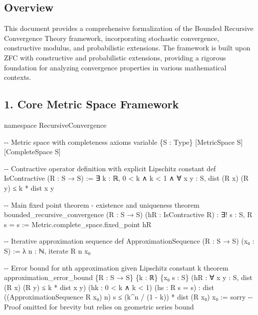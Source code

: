 \documentclass[
]{article}
\newenvironment{Shaded}{}{}
\newcommand{\NormalTok}[1]{#1}
\begin{document}
\subsection{Overview}\label{overview}

This document provides a comprehensive formalization of the Bounded
Recursive Convergence Theory framework, incorporating stochastic
convergence, constructive modulus, and probabilistic extensions. The
framework is built upon ZFC with constructive and probabilistic
extensions, providing a rigorous foundation for analyzing convergence
properties in various mathematical contexts.

\subsection{1. Core Metric Space
Framework}\label{core-metric-space-framework}

\begin{Shaded}
\begin{Highlighting}[]
\NormalTok{namespace RecursiveConvergence}

\NormalTok{{-}{-} Metric space with completeness axioms}
\NormalTok{variable \{S : Type\} [MetricSpace S] [CompleteSpace S]}

\NormalTok{{-}{-} Contractive operator definition with explicit Lipschitz constant}
\NormalTok{def IsContractive (R : S → S) :=}
\NormalTok{  ∃ k : ℝ, 0 \textless{} k ∧ k \textless{} 1 ∧ ∀ x y : S, dist (R x) (R y) ≤ k * dist x y}

\NormalTok{{-}{-} Main fixed point theorem {-} existence and uniqueness}
\NormalTok{theorem bounded\_recursive\_convergence}
\NormalTok{  (R : S → S) (hR : IsContractive R) :}
\NormalTok{  ∃! s : S, R s = s :=}
\NormalTok{  Metric.complete\_space.fixed\_point hR}

\NormalTok{{-}{-} Iterative approximation sequence}
\NormalTok{def ApproximationSequence (R : S → S) (x₀ : S) := λ n : ℕ, iterate R n x₀}

\NormalTok{{-}{-} Error bound for nth approximation given Lipschitz constant k}
\NormalTok{theorem approximation\_error\_bound}
\NormalTok{  \{R : S → S\} \{k : ℝ\} \{x₀ s : S\}}
\NormalTok{  (hR : ∀ x y : S, dist (R x) (R y) ≤ k * dist x y)}
\NormalTok{  (hk : 0 \textless{} k ∧ k \textless{} 1)}
\NormalTok{  (hs : R s = s) :}
\NormalTok{  dist ((ApproximationSequence R x₀) n) s ≤ (k\^{}n / (1 {-} k)) * dist (R x₀) x₀ :=}
\NormalTok{  sorry {-}{-} Proof omitted for brevity but relies on geometric series bound}
\end{Highlighting}
\end{Shaded}
\end{document}
